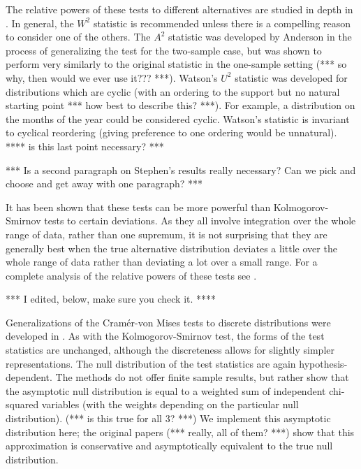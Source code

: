 The relative powers of these tests to different alternatives are
studied in depth in \cite{stephens1974}. In general, the $W^2$
statistic is recommended unless there is a compelling reason to
consider one of the others. The $A^2$ statistic was developed by
Anderson in the process of generalizing the test for the two-sample case,
but was shown to perform very similarly to the original statistic
in the one-sample setting (*** so why, then would we ever use it??? ***).
Watson's $U^2$ statistic was developed for distributions
which are cyclic (with an ordering to the support but
no natural starting point  *** how best to describe this? ***). 
For example, a distribution on the months of the year could be considered
cyclic. Watson's statistic is invariant to cyclical reordering (giving preference to one ordering would be unnatural).  **** is this last point necessary? ***

*** Is a second paragraph on Stephen's results really necessary?  Can we
pick and choose and get away with one paragraph? ***

It has been shown that these tests can be more powerful than Kolmogorov-Smirnov tests to certain deviations. As they all involve
integration over the whole range of data, rather than one supremum, it is not surprising that they are generally best when the
true alternative distribution deviates a little over the whole range of data rather than deviating a lot over a small range. For
a complete analysis of the relative powers of these tests see \cite{stephens1974}.


*** I edited, below, make sure you check it. ****

Generalizations of the Cram\'{e}r-von Mises tests to discrete
distributions were developed in \cite{choulakian1994}. As with the
Kolmogorov-Smirnov test, the forms of the test statistics are unchanged, although the discreteness allows for slightly simpler representations.
The null distribution of the test statistics are again hypothesis-dependent. The methods do not offer finite sample results, but rather show that the asymptotic null distribution is equal to a weighted sum of independent
chi-squared variables (with the weights depending on the particular
null distribution). (*** is this true for all 3? ***)
We implement this asymptotic distribution here;
the original papers (*** really, all of them? ***)
show that this approximation is conservative 
and asymptotically equivalent to the true null distribution.

